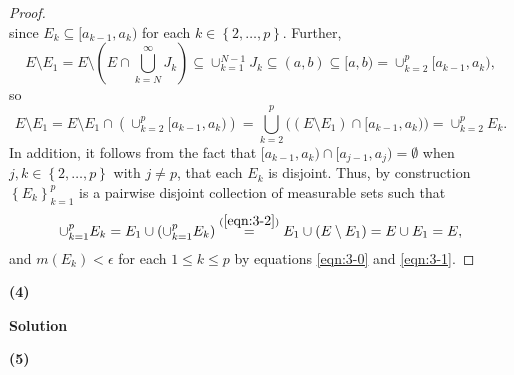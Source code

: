 \documentclass[12pt]{article}
\begin{document}
\begin{proof}
\begin{equation}
\label{eqn:3-1}
\end{equation}
since $E_{k} \subseteq [a_{k-1}, a_{k})$ for each $k \in \left\{ 2, \dots, p \right\}$. 
Further, 
\[ E \setminus E_{1} = E \setminus \left( E\cap \bigcup_{k=N}^{\infty}J_{k} \right) \subseteq \cup_{k=1}^{N-1}J_{k} \subseteq (a, b) \subseteq [a,b)
 = \cup_{k=2}^{p}[a_{k-1}, a_{k}), \]
so 
\begin{equation}
E\setminus E_{1} = E\setminus E_{1} \cap \left( \cup_{k=2}^{p}[a_{k-1},a_{k}) \right) = \bigcup_{k=2}^{p}\bigg((E\setminus E_{1})\cap [a_{k-1},
a_{k})\bigg) = \cup_{k=2}^{p}E_{k}. 
\label{eqn:3-2}
\end{equation}
In addition, it follows from the fact that $[a_{k-1}, a_{k}) \cap [a_{j-1}, a_{j}) = \emptyset$ when $j,k \in \left\{ 2,\dots, p \right\}$ with $j
\neq p$, that each $E_{k}$ is disjoint. Thus, by construction $\left\{ E_{k} \right\}_{k=1}^{p}$ is a pairwise disjoint collection of measurable sets such that 
\[ \cup_{k=1}^{p}E_{k} = E_{1}\cup \left( \cup_{k=1}^{p}E_{k} \right) \stackrel{(\ref{eqn:3-2})}{=} E_{1} \cup \left( E\setminus
E_{1} \right) = E\cup E_{1} = E, \]
and $m(E_{k}) < \epsilon$ for each $1 \leq k \leq p$ by equations \ref{eqn:3-0} and \ref{eqn:3-1}.
\end{proof}

{\bf (4)} 

{\bf Solution}


{\bf (5)}
\end{document}
